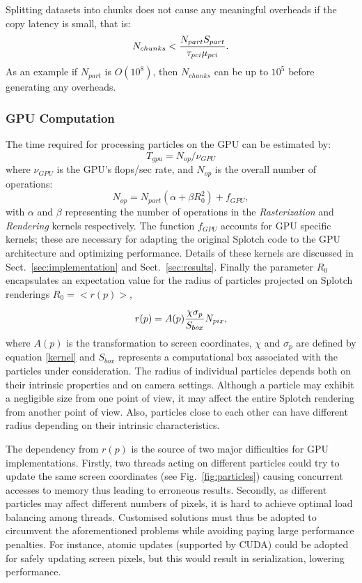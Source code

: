 \documentclass[smallextended]{svjour3}
\begin{document}
Splitting datasets into chunks does not cause any meaningful overheads if the copy latency is small, that is:
\begin{equation}
N_{chunks} < {N_{part} S_{part}\over \tau_{pci}\mu_{pci}}.
\end{equation}
As an example if $N_{part}$ is $O(10^8)$, then $N_{chunks}$ can be up to $10^5$ before
generating any overheads. 

\subsubsection{GPU Computation}
The time required for processing particles on the GPU can be estimated by:
\begin{equation}
T_{gpu} = N_{op}/\nu_{GPU}
\end{equation}
where $\nu_{GPU}$ is the GPU's flops/sec rate, and $N_{op}$ is the overall number of operations:
\begin{equation}\label{ops}
N_{op} = N_{part}(\alpha + \beta R_0^2) + f_{GPU},
\end{equation}
with $\alpha$ and $\beta$ representing the number of operations in the \textit{Rasterization} and \textit{Rendering} kernels respectively.
The function $f_{GPU}$ accounts for GPU specific kernels; these are necessary for adapting the original Splotch code to the GPU architecture and optimizing performance. Details of these kernels are discussed in Sect.~\ref{sec:implementation} and Sect.~\ref{sec:results}.
Finally the parameter $R_0$ encapsulates an expectation value for the radius of particles projected on Splotch renderings $R_0 = <r(p)>$,

\begin{equation}\label{radius}
r(p) = A(p){\chi \sigma_p\over S_{box}} N_{pix},
\end{equation} 
where $A(p)$ is the transformation to screen coordinates, $\chi$ and $\sigma_p$ are defined by equation \eqref{kernel} and $S_{box}$ represents a computational box associated with the particles under consideration. 
The radius of individual particles depends both on their intrinsic properties and on camera settings. Although a particle may exhibit a negligible size from one point of view, it may affect the entire Splotch rendering from another point of view. Also, particles close to each other can have different radius depending on their intrinsic characteristics.

The dependency from $r(p)$ is the source of two major difficulties for GPU implementations. Firstly, two threads acting on different particles could try 
to update the same screen coordinates (see Fig.~\ref{fig:particles}) causing concurrent accesses to memory thus leading to erroneous results. 
Secondly, as different particles may affect different numbers of pixels, it is hard to achieve optimal load balancing among threads.  
Customised solutions must thus be adopted to circumvent the aforementioned problems while avoiding paying large performance penalties. For instance, atomic updates (supported by CUDA) could be adopted for safely updating screen pixels, but this would result in serialization, lowering performance. 
\end{document}
